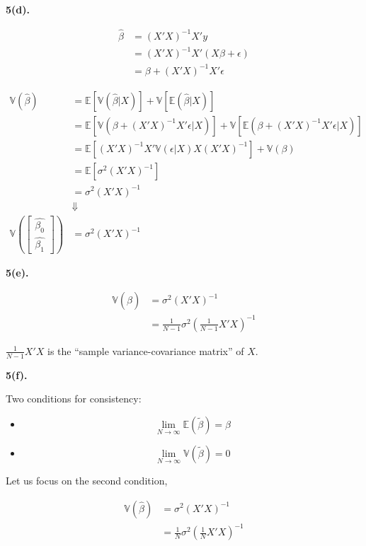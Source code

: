 \documentclass[UTF8]{ctexart}
\begin{document}
\textbf{5(d).}

\begin{align*}
    \hat{\beta} &= (X'X)^{-1}X'y \\
    &=(X'X)^{-1}X'(X\beta+\epsilon) \\
    &=\beta+(X'X)^{-1}X'\epsilon
\end{align*}

\begin{align*}
    \mathbb{V}(\hat{\beta})&=\mathbb{E}[\mathbb{V}(\hat{\beta}|X)]+
    \mathbb{V}[\mathbb{E}(\hat{\beta}|X)] \\
    &=\mathbb{E}[\mathbb{V}(\beta+(X'X)^{-1}X'\epsilon|X)]+
    \mathbb{V}[\mathbb{E}(\beta+(X'X)^{-1}X'\epsilon|X)]\\
    &=\mathbb{E}[(X'X)^{-1}X'\mathbb{V}(\epsilon|X)X(X'X)^{-1}]+
    \mathbb{V}(\beta) \\
    &=\mathbb{E}[\sigma^2(X'X)^{-1}]\\
    &=\sigma^2(X'X)^{-1} \\
    &\Downarrow \\
    \mathbb{V}\left(
    \begin{bmatrix}
        \hat{\beta_0} \\
        \hat{\beta_1}
    \end{bmatrix}\right)
    &=\sigma^2(X'X)^{-1}
\end{align*}
\par 

\textbf{5(e).}

\begin{align*}
    \mathbb{V}(\hat{\beta})&=\sigma^2(X'X)^{-1} \\
    &=\frac{1}{N-1}\sigma^2(\frac{1}{N-1}X'X)^{-1}
\end{align*}

$\frac{1}{N-1}X'X$ is the ``sample variance-covariance matrix'' of $X$.

\textbf{5(f).}

Two conditions for consistency:
\begin{itemize}
    \item \[\lim_{N \to \infty}\mathbb{E}(\tilde{\beta})=\beta \] 
    \item \[\lim_{N \to \infty}\mathbb{V}(\tilde{\beta})=0 \]  
\end{itemize}

Let us focus on the second condition,

\begin{align*}
    \mathbb{V}(\hat{\beta})&=\sigma^2(X'X)^{-1} \\
    &=\frac{1}{N}\sigma^2(\frac{1}{N}X'X)^{-1}
\end{align*}
\end{document}
